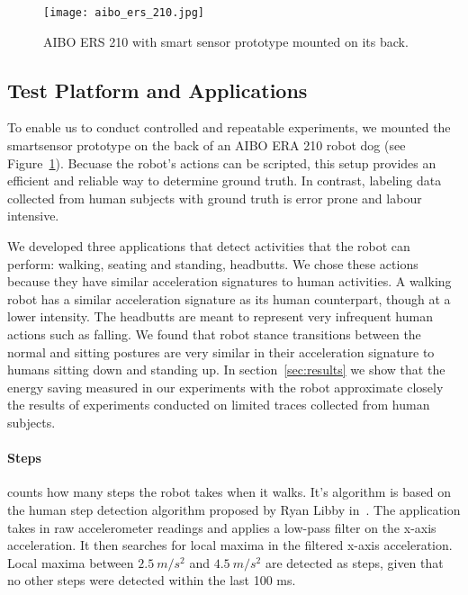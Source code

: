 \begin{figure}[t]
	\texttt{[image: aibo\_ers\_210.jpg]}
	\caption{AIBO ERS 210 with smart sensor prototype mounted on its back.}
	\label{fig:aibo}
\end{figure}

\subsection{Test Platform and Applications}
\label{sec:applications}

To enable us to conduct controlled and repeatable experiments, we
mounted the smartsensor prototype on the back of an AIBO ERA 210 robot
dog (see Figure~\ref{fig:aibo}).  Becuase the robot's actions can be
scripted, this setup provides an efficient and reliable way to
determine ground truth.  In contrast, labeling data collected from
human subjects with ground truth is error prone and labour intensive.

We developed three applications that detect activities that the robot
can perform: walking, seating and standing, headbutts.  We chose these
actions because they have similar acceleration signatures to human
activities. A walking robot has a similar acceleration signature as
its human counterpart, though at a lower intensity. The headbutts are
meant to represent very infrequent human actions such as falling. We
found that robot stance transitions between the normal and sitting
postures are very similar in their acceleration signature to humans
sitting down and standing up.  In section~\ref{sec:results} we show
that the energy saving measured in our experiments with the robot
approximate closely the results of experiments conducted on limited
traces collected from human subjects.

\paragraph{Steps} counts how many steps the robot takes when it
  walks. It's algorithm is based on the human step detection algorithm
  proposed by Ryan Libby in~\cite{libbyFootstepDetection}. The
  application takes in raw accelerometer readings and applies a
  low-pass filter on the x-axis acceleration. It then searches for
  local maxima in the filtered x-axis acceleration. Local maxima
  between $2.5\:m/s^2$ and $4.5\:m/s^2$ are detected as steps, given
  that no other steps were detected within the last 100 ms.

